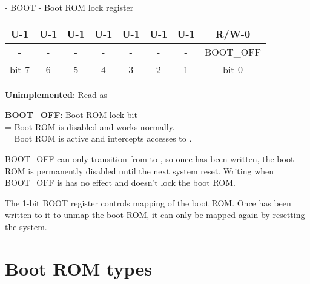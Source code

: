 \documentclass[\main/gbctr.tex]{subfiles}
\begin{document}
\begin{register}[H]
  \caption{ - BOOT - Boot ROM lock register}
  {
    \ttfamily
    \begin{tabularx}{\linewidth}{|C|C|C|C|C|C|C|C|}
      \hline
      U-1 & U-1 & U-1 & U-1 & U-1 & U-1 & U-1 & R/W-0 \\
      \hline
       - &  - &  - &  - &  - &  - &  - & BOOT\_OFF \\
      \hline
      bit 7 & 6 & 5 & 4 & 3 & 2 & 1 & bit 0 \\
      \hline
    \end{tabularx}{\parfillskip=0pt\par}
  }

  \begin{description}[leftmargin=5em, style=nextline]
    \item[bit 7-1]
      \textbf{Unimplemented}: Read as 
    \item[bit 0]
      \textbf{BOOT\_OFF}: Boot ROM lock bit\\
      = Boot ROM is disabled and  works normally.\\
      = Boot ROM is active and intercepts accesses to .

      \bigskip

      BOOT\_OFF can only transition from  to , so once 
      has been written, the boot ROM is permanently disabled until the next
      system reset. Writing  when BOOT\_OFF is  has no effect and
      doesn't lock the boot ROM.
  \end{description}
\end{register}

The 1-bit BOOT register controls mapping of the boot ROM. Once  has been
written to it to unmap the boot ROM, it can only be mapped again by resetting
the system.

\section{Boot ROM types}
\end{document}
